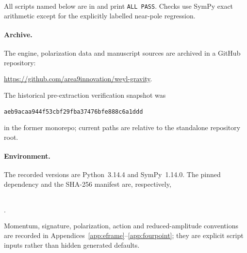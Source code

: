 \documentclass[11pt]{article}
\theoremstyle{definition}
\theoremstyle{remark}
\begin{document}
All scripts named below are in  and print
\texttt{ALL PASS}.  Checks use SymPy exact arithmetic except for the
explicitly labelled near-pole regression.

\paragraph{Archive.}
The engine, polarization data and manuscript sources are archived in a
GitHub repository:
\begin{center}
\url{https://github.com/area9innovation/weyl-gravity}.
\end{center}
The historical pre-extraction verification snapshot was
\begin{center}
\texttt{aeb9acaa944f53cbf29fba37476bfe888c6a1ddd}
\end{center}
in the former monorepo; current paths are relative to the standalone
repository root.

\paragraph{Environment.}
The recorded versions are Python~3.14.4 and SymPy~1.14.0.  The pinned
dependency and the SHA-256 manifest are, respectively,
\begin{center}
\\
.
\end{center}
Momentum, signature, polarization, action and reduced-amplitude
conventions are recorded in
Appendices~\ref{app:eframe}--\ref{app:fourpoint}; they are explicit
script inputs rather than hidden generated defaults.
\end{document}
